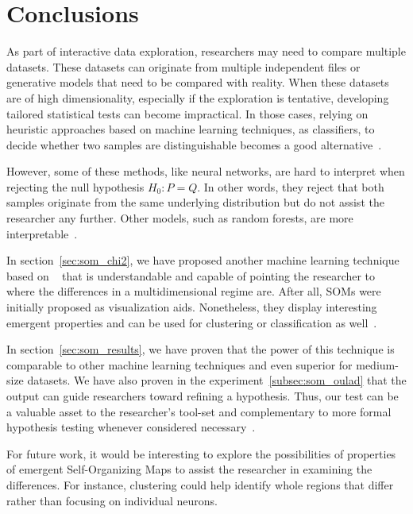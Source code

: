 \section{Conclusions}
\label{sec:som_conclusions}
As part of interactive data exploration, researchers may need to
compare multiple datasets.
These datasets can originate from multiple independent files or
generative models that need to be compared with reality. When these
datasets are of high dimensionality, especially if the exploration is
tentative, developing tailored statistical tests can become impractical.
In those cases, relying on heuristic approaches based on machine
learning techniques, as classifiers, to decide whether two samples are
distinguishable becomes a good
alternative~\cite{friedman2004multivariate,kim2021classification}.

However, some of these methods, like neural networks, are hard to interpret
when rejecting the null hypothesis $H_0: P = Q$. In other words, they
reject that both samples originate from the same underlying distribution
but do not assist the researcher any further.
Other models, such as random forests, are more  interpretable~\cite{friedman2004multivariate}.

In section~\ref{sec:som_chi2}, we have proposed another machine learning
technique based on ~\cite{kohonen1982self} that is
understandable and capable of pointing the researcher to where the differences
in a multidimensional regime are. After all, \glspl{SOM} were initially
proposed as visualization aids. Nonetheless, they display interesting
emergent properties and can be used for clustering or classification as
well~\cite{ultsch2007emergence}.

In section~\ref{sec:som_results}, we have proven that the power of this
technique is comparable to other machine learning techniques and even
superior for medium-size datasets.
We have also proven in the experiment~\ref{subsec:som_oulad} that the
output can guide researchers toward refining a hypothesis. Thus, our
test can be a valuable asset to the researcher's tool-set and complementary
to more formal hypothesis testing whenever considered necessary~\cite{rosenblatt2021better}.

For future work, it would be interesting to explore the possibilities of
properties of emergent Self-Organizing Maps to assist the researcher
in examining the differences.
For instance, clustering could help identify whole regions that differ
rather than focusing on individual neurons.
